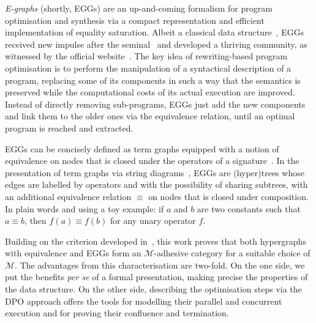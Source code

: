 \documentclass[a4paper,UKenglish,cleveref,pdftex,thm-restate,numberwithinsect]{lipics-v2021}
\begin{document}
\emph{E-graphs} (shortly, EGGs) are an up-and-coming formalism for program optimisation and synthesis via a compact 
representation and efficient implementation of equality saturation. 
%
Albeit a classical data structure~\cite{DetlefsNS05}, EGGs received 
new impulse after the seminal~\cite{WillseyNWFTP21} and
developed a thriving community, as witnessed by the official website~\cite{eggs}.
%
The key idea of rewriting-based program optimisation is to perform the manipulation of a syntactical description 
of a program, replacing some of its components in such a way that the semantics is preserved while 
the computational costs of its actual execution are improved. Instead of directly removing sub-programs, EGGs just add the 
new components and link them to the older ones via the equivalence relation, until an optimal program is 
reached and extracted.

EGGs can be concisely defined as term graphs equipped with a notion of equivalence on nodes
that is closed under the operators of a signature~\cite[Section~4.2]{DetlefsNS05}.
In the presentation of term graphs via string diagrams~\cite{CastelnovoGM24}, EGGs are (hyper)trees 
whose edges are labelled by operators and with
the possibility of sharing subtrees, with an additional equivalence relation $\equiv$ on nodes that 
is closed under composition. In plain words and using a toy example:
if $a$ and $b$ are two constants such that $a \equiv b$, then $f(a) \equiv f(b)$ for any unary operator $f$.



Building on the criterion developed in~\cite{CastelnovoGM24}, this work proves that both hypergraphs with equivalence
and EGGs form an 
$\mathcal{M}$-adhesive category for a suitable choice of $\mathcal{M}$.
The advantages from this characterisation are two-fold. On the one side, 
we put the benefits \emph{per se} of a formal presentation, making precise the properties of the data structure. 
On the other side, describing the optimisation steps via the DPO approach
offers the tools for modelling their parallel and concurrent execution
and for proving their confluence and termination.
\end{document}
